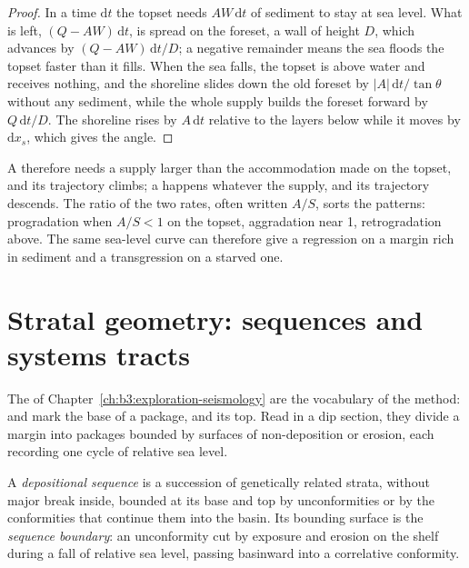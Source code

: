 \begin{proof}
In a time $\mathrm dt$ the topset needs $AW\,\mathrm dt$ of sediment to stay
at sea level. What is left, $(Q - AW)\,\mathrm dt$, is spread on the foreset,
a wall of height $D$, which advances by $(Q - AW)\,\mathrm dt/D$; a negative
remainder means the sea floods the topset faster than it fills. When the sea
falls, the topset is above water and receives nothing, and the shoreline
slides down the old foreset by $|A|\,\mathrm dt/\tan\theta$ without any
sediment, while the whole supply builds the foreset forward by $Q\,\mathrm
dt/D$. The shoreline rises by $A\,\mathrm dt$ relative to the layers below
while it moves by $\mathrm dx_s$, which gives the angle.
\end{proof}

A  therefore needs a supply larger than the accommodation
made on the topset, and its trajectory climbs; a  happens
whatever the supply, and its trajectory descends. The ratio of the two rates,
often written $A/S$, sorts the patterns: progradation when $A/S < 1$ on the
topset, aggradation near 1, retrogradation above. The same sea-level curve
can therefore give a regression on a margin rich in sediment and a
transgression on a starved one.

\section{Stratal geometry: sequences and systems tracts}\label{sec:b3:sequence-stratigraphy:sequences}

The  of Chapter~\ref{ch:b3:exploration-seismology}
are the vocabulary of the method:  and  mark the base of a
package,  and  its top. Read in a dip section, they
divide a margin into packages bounded by surfaces of non-deposition or
erosion, each recording one cycle of relative sea level.

\begin{definition}\label{def:b3:sequence-stratigraphy:sequence}
A \emph{depositional sequence} is a succession
of genetically related strata, without major break inside, bounded at its base
and top by unconformities or by the conformities that continue them into the
basin. Its bounding surface is the \emph{sequence
boundary}: an unconformity cut by exposure and
erosion on the shelf during a fall of relative sea level, passing basinward
into a correlative conformity.
\end{definition}

